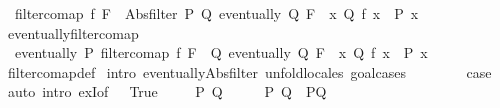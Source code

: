 \begin{isabellebody}
\ \ {\isachardoublequoteopen}filtercomap\ f\ F\ {\isacharequal}{\kern0pt}\ Abs{\isacharunderscore}{\kern0pt}filter\ {\isacharparenleft}{\kern0pt}{\isasymlambda}P{\isachardot}{\kern0pt}\ {\isasymexists}Q{\isachardot}{\kern0pt}\ eventually\ Q\ F\ {\isasymand}\ {\isacharparenleft}{\kern0pt}{\isasymforall}x{\isachardot}{\kern0pt}\ Q\ {\isacharparenleft}{\kern0pt}f\ x{\isacharparenright}{\kern0pt}\ {\isasymlongrightarrow}\ P\ x{\isacharparenright}{\kern0pt}{\isacharparenright}{\kern0pt}{\isachardoublequoteclose}\isanewline
\isanewline
{}\isamarkupfalse%
\ eventually{\isacharunderscore}{\kern0pt}filtercomap{\isacharcolon}{\kern0pt}\isanewline
\ \ {\isachardoublequoteopen}eventually\ P\ {\isacharparenleft}{\kern0pt}filtercomap\ f\ F{\isacharparenright}{\kern0pt}\ {\isasymlongleftrightarrow}\ {\isacharparenleft}{\kern0pt}{\isasymexists}Q{\isachardot}{\kern0pt}\ eventually\ Q\ F\ {\isasymand}\ {\isacharparenleft}{\kern0pt}{\isasymforall}x{\isachardot}{\kern0pt}\ Q\ {\isacharparenleft}{\kern0pt}f\ x{\isacharparenright}{\kern0pt}\ {\isasymlongrightarrow}\ P\ x{\isacharparenright}{\kern0pt}{\isacharparenright}{\kern0pt}{\isachardoublequoteclose}\isanewline
%
\isadelimproof
\ \ %
\endisadelimproof
%
\isatagproof
{}\isamarkupfalse%
\ filtercomap{\isacharunderscore}{\kern0pt}def\isanewline
{}\isamarkupfalse%
\ {\isacharparenleft}{\kern0pt}intro\ eventually{\isacharunderscore}{\kern0pt}Abs{\isacharunderscore}{\kern0pt}filter{\isacharcomma}{\kern0pt}\ unfold{\isacharunderscore}{\kern0pt}locales{\isacharcomma}{\kern0pt}\ goal{\isacharunderscore}{\kern0pt}cases{\isacharparenright}{\kern0pt}\isanewline
\ \ \isamarkupfalse%
\ {}\isanewline
\ \ \isamarkupfalse%
\ {\isacharquery}{\kern0pt}case\ \isamarkupfalse%
\ {\isacharparenleft}{\kern0pt}auto\ intro{\isacharbang}{\kern0pt}{\isacharcolon}{\kern0pt}\ exI{\isacharbrackleft}{\kern0pt}of\ {\isacharunderscore}{\kern0pt}\ {\isachardoublequoteopen}{\isasymlambda}{\isacharunderscore}{\kern0pt}{\isachardot}{\kern0pt}\ True{\isachardoublequoteclose}{\isacharbrackright}{\kern0pt}{\isacharparenright}{\kern0pt}\isanewline
{}\isamarkupfalse%
\isanewline
\ \ \isamarkupfalse%
\ {\isacharparenleft}{\kern0pt}{}\ P\ Q{\isacharparenright}{\kern0pt}\isanewline
\ \ \isamarkupfalse%
\ \isamarkupfalse%
\ P{\isacharprime}{\kern0pt}\ Q{\isacharprime}{\kern0pt}\ \ P{\isacharprime}{\kern0pt}Q{\isacharprime}{\kern0pt}{\isacharcolon}{\kern0pt}\isanewline

\end{isabellebody}
